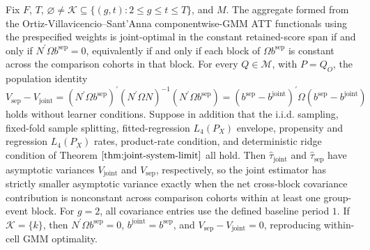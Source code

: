 Fix \(F\), \(T\), \(\varnothing\ne\mathcal K\subseteq\{(g,t):2\le g\le t\le T\}\), and \(M\). The aggregate formed from the Ortiz-Villavicencio--Sant'Anna componentwise-GMM ATT functionals using the prespecified weights is joint-optimal in the constant retained-score span if and only if \(N^{\prime}\Omega b^{\mathrm{sep}}=0\), equivalently if and only if each block of \(\Omega b^{\mathrm{sep}}\) is constant across the comparison cohorts in that block. For every \(Q\in\mathcal M\), with \(P=Q_O\), the population identity
\[
V_{\mathrm{sep}}-V_{\mathrm{joint}}
=(N^{\prime}\Omega b^{\mathrm{sep}})^{\prime}(N^{\prime}\Omega N)^{-1}(N^{\prime}\Omega b^{\mathrm{sep}})
=(b^{\mathrm{sep}}-b^{\mathrm{joint}})^{\prime}\Omega(b^{\mathrm{sep}}-b^{\mathrm{joint}})
\]
holds without learner conditions. Suppose in addition that the i.i.d. sampling, fixed-fold sample splitting, fitted-regression \(L_4(P_X)\) envelope, propensity and regression \(L_4(P_X)\) rates, product-rate condition, and deterministic ridge condition of Theorem \(\ref{thm:joint-system-limit}\) all hold. Then \(\widehat\tau_{\mathrm{joint}}\) and \(\widehat\tau_{\mathrm{sep}}\) have asymptotic variances \(V_{\mathrm{joint}}\) and \(V_{\mathrm{sep}}\), respectively, so the joint estimator has strictly smaller asymptotic variance exactly when the net cross-block covariance contribution is nonconstant across comparison cohorts within at least one group-event block. For \(g=2\), all covariance entries use the defined baseline period \(1\). If \(\mathcal K=\{k\}\), then \(N^{\prime}\Omega b^{\mathrm{sep}}=0\), \(b^{\mathrm{joint}}=b^{\mathrm{sep}}\), and \(V_{\mathrm{sep}}-V_{\mathrm{joint}}=0\), reproducing within-cell GMM optimality.